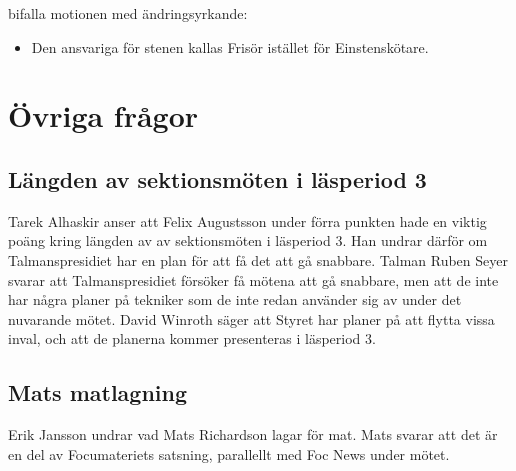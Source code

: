 \documentclass[hidelinks]{sektionsmote} %
\begin{document}
\begin{beslut}
  \item bifalla motionen med ändringsyrkande:
  \begin{itemize}
    \item Den ansvariga för stenen kallas Frisör istället för Einstenskötare.
  \end{itemize}
\end{beslut}

\section{Övriga frågor}
\subsection{Längden av sektionsmöten i läsperiod 3}
Tarek Alhaskir anser att Felix Augustsson under förra punkten hade en viktig poäng kring längden av av sektionsmöten i läsperiod 3.
Han undrar därför om Talmanspresidiet har en plan för att få det att gå snabbare.
Talman Ruben Seyer svarar att Talmanspresidiet försöker få mötena att gå snabbare, men att de inte har några planer på tekniker som de inte redan använder sig av under det nuvarande mötet.
David Winroth säger att Styret har planer på att flytta vissa inval, och att de planerna kommer presenteras i läsperiod 3.

\subsection{Mats matlagning}
Erik Jansson undrar vad  Mats Richardson lagar för mat.
Mats svarar att det är en del av Focumateriets satsning, parallellt med Foc News under mötet.
\end{document}

